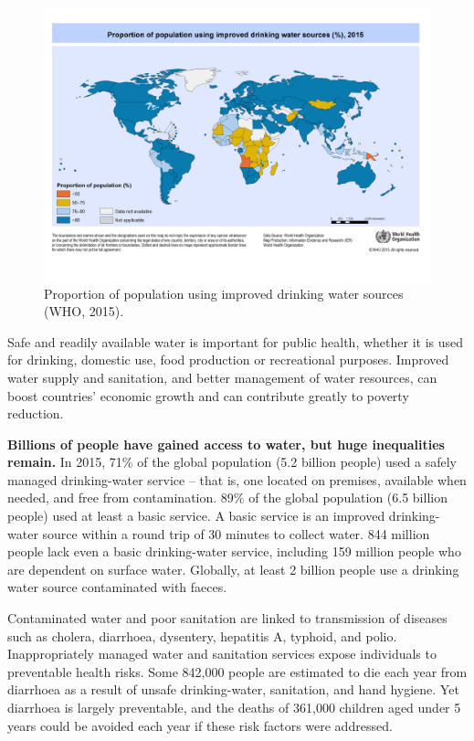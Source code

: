 \documentclass[]{book}
\begin{document}
\begin{figure}

{\centering \includegraphics[width=1\linewidth]{figures/global_water_2015} 

}

\caption{Proportion of population using improved drinking water sources (WHO, 2015).}\label{fig:global-water}
\end{figure}

Safe and readily available water is important for public health, whether
it is used for drinking, domestic use, food production or recreational
purposes. Improved water supply and sanitation, and better management of
water resources, can boost countries' economic growth and can contribute
greatly to poverty reduction.

\textbf{Billions of people have gained access to water, but huge
inequalities remain.} In 2015, 71\% of the global population (5.2
billion people) used a safely managed drinking-water service -- that is,
one located on premises, available when needed, and free from
contamination. 89\% of the global population (6.5 billion people) used
at least a basic service. A basic service is an improved drinking-water
source within a round trip of 30 minutes to collect water. 844 million
people lack even a basic drinking-water service, including 159 million
people who are dependent on surface water. Globally, at least 2 billion
people use a drinking water source contaminated with faeces.

Contaminated water and poor sanitation are linked to transmission of
diseases such as cholera, diarrhoea, dysentery, hepatitis A, typhoid,
and polio. Inappropriately managed water and sanitation services expose
individuals to preventable health risks. Some 842,000 people are
estimated to die each year from diarrhoea as a result of unsafe
drinking-water, sanitation, and hand hygiene. Yet diarrhoea is largely
preventable, and the deaths of 361,000 children aged under 5 years could
be avoided each year if these risk factors were addressed.
\end{document}
